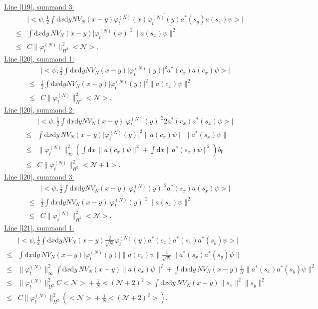 \documentclass[11pt,a4paper]{scrartcl}
\newcommand{\di}{\textrm{d}}		%
\newcommand{\Ncal}{\mathcal{N}}		%
\newcommand{\estlist}[2]{\underline{Line \ref{l#1}, summand #2:}}
\newcommand{\scal}[2]{\big<#1,#2\big>} %
\newcommand{\cc}[1]{\overline{#1}}	%
\newcommand{\norm}[1]{\lVert#1\rVert}	%
\newcommand{\ev}[1]{\big<#1\big>}	%
\newcommand{\ph}{\varphi_t^{(N)}}	%
\newcommand{\dxyNV}{\frac{1}{2}\int \di x\di y N V_N(x-y)} %
\begin{document}
\estlist{19}{3}
\begin{align*}
& \lvert \scal{\psi}{\dxyNV \ph(x)\cc{\ph(y)}a^\ast(s_y)a(s_x)\psi}\rvert \\
\leq & \int \di x \di y\, N V_N(x-y) \lvert \ph(x)\rvert^2 \norm{a(s_x)\psi}^2 \\
\leq & C\norm{\ph}_{H^2}^2 \ev{\Ncal}.
\end{align*}
\estlist{20}{1}
\begin{align*}
 & \lvert \scal{\psi}{\dxyNV \lvert \ph(y)\rvert^2 a^\ast(c_x)a(c_x)\psi} \rvert \\
\leq & \dxyNV \lvert\ph(y)\rvert^2 \norm{a(c_x)\psi}^2 \\
\leq & C \norm{\ph}_{H^2}^2 \ev{\Ncal}.
\end{align*}
\estlist{20}{2}
\begin{align*}
& \lvert \scal{\psi}{\dxyNV \lvert\ph(y)\rvert^2 2 a^\ast(c_x) a^\ast(s_x)\psi} \rvert \\
\leq & \int \di x\di y\, NV_N(x-y) \lvert\ph(y)\rvert^2 \norm{a(c_x)\psi} \norm{a^\ast(s_x)\psi} \\
\leq & \norm{\ph}_\infty^2 \left( \int \di x\, \norm{a(c_x)\psi}^2 + \int \di x \norm{a^\ast(s_x)\psi}^2\right) b_0 \\
\leq & C\norm{\ph}_{H^2}^2 \ev{\Ncal+1}.
\end{align*}
\estlist{20}{3}
\begin{align*}
 & \lvert \scal{\psi}{\dxyNV \lvert \ph(y)\rvert^2 a^\ast(s_x) a(s_x)\psi} \rvert \\
\leq & \dxyNV \lvert\ph(y)\rvert^2 \norm{a(s_x)\psi}^2\\
\leq & C\norm{\ph}_{H^2}^2 \ev{\Ncal}.
\end{align*}
\estlist{21}{1}
\begin{align*}
 & \lvert \scal{\psi}{\dxyNV \frac{2}{\sqrt{N}}\cc{\ph(y)}a^\ast(c_x)a^\ast(s_x)a^\ast(s_y)\psi} \rvert \\
\leq & \int \di x\di y\, NV_N(x-y) \lvert\ph(y)\rvert \norm{a(c_x)\psi}\frac{1}{\sqrt{N}}\norm{a^\ast(s_x)a^\ast(s_y)\psi} \\
\leq & \norm{\ph}_\infty^2 \int \di x\di y\, NV_N(x-y) \norm{a(c_x)\psi}^2 + \int \di x\di y\, NV_N(x-y) \frac{1}{N} \norm{a^\ast(s_x)a^\ast(s_y)\psi}^2 \\
\leq & \norm{\ph}_{H^2}^2 C \ev{\Ncal} + \frac{1}{N}\ev{(\Ncal+2)^2} \int \di x\di y\, NV_N(x-y) \norm{s_x}^2 \norm{s_y}^2 \\
\leq & C\norm{\ph}_{H^2}^2 \left( \ev{\Ncal} + \frac{1}{N}\ev{(\Ncal+2)^2} \right).
\end{align*}
\end{document}
